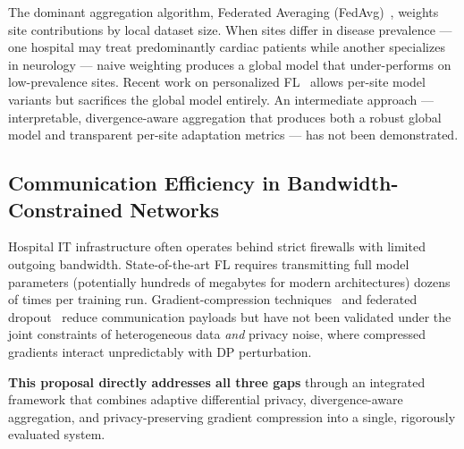 The dominant aggregation algorithm, Federated Averaging (FedAvg)~\cite{mcmahan2017},
weights site contributions by local dataset size. When sites differ in disease prevalence —
one hospital may treat predominantly cardiac patients while another specializes in
neurology — naive weighting produces a global model that under-performs on low-prevalence
sites. Recent work on personalized FL~\cite{fallah2020} allows per-site model variants but
sacrifices the global model entirely. An intermediate approach — interpretable,
divergence-aware aggregation that produces both a robust global model and transparent
per-site adaptation metrics — has not been demonstrated.

\subsection{Communication Efficiency in Bandwidth-Constrained Networks}

Hospital IT infrastructure often operates behind strict firewalls with limited outgoing
bandwidth. State-of-the-art FL requires transmitting full model parameters (potentially
hundreds of megabytes for modern architectures) dozens of times per training run.
Gradient-compression techniques~\cite{lin2018} and federated dropout~\cite{caldas2018}
reduce communication payloads but have not been validated under the joint constraints of
heterogeneous data \emph{and} privacy noise, where compressed gradients interact
unpredictably with DP perturbation.

\textbf{This proposal directly addresses all three gaps} through an integrated framework
that combines adaptive differential privacy, divergence-aware aggregation, and
privacy-preserving gradient compression into a single, rigorously evaluated system.

